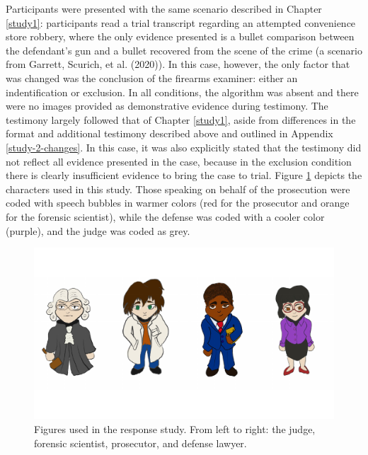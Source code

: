 \documentclass[print]{nuthesis}
\begin{document}
Participants were presented with the same scenario described in Chapter \ref{study1}: participants read a trial transcript regarding an attempted convenience store robbery, where the only evidence presented is a bullet comparison between the defendant's gun and a bullet recovered from the scene of the crime (a scenario from Garrett, Scurich, et al. (2020)).
In this case, however, the only factor that was changed was the conclusion of the firearms examiner: either an indentification or exclusion.
In all conditions, the algorithm was absent and there were no images provided as demonstrative evidence during testimony.
The testimony largely followed that of Chapter \ref{study1}, aside from differences in the format and additional testimony described above and outlined in Appendix \ref{study-2-changes}.
In this case, it was also explicitly stated that the testimony did not reflect all evidence presented in the case, because in the exclusion condition there is clearly insufficient evidence to bring the case to trial.
Figure \ref{fig:responsefigures} depicts the characters used in this study.
Those speaking on behalf of the prosecution were coded with speech bubbles in warmer colors (red for the prosecutor and orange for the forensic scientist), while the defense was coded with a cooler color (purple), and the judge was coded as grey.

\begin{figure}

{\centering \includegraphics[width=\linewidth]{thesis_files/figure-latex/responsefigures-1} 

}

\caption[Figures used in the response study.]{Figures used in the response study. From left to right: the judge, forensic scientist, prosecutor, and defense lawyer.}\label{fig:responsefigures}
\end{figure}
\end{document}
